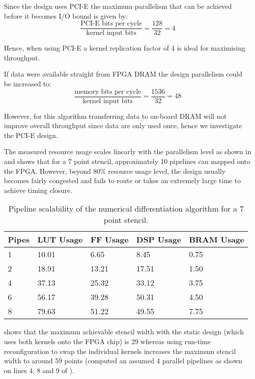 Since the design uses PCI-E the maximum parallelism that can be
achieved before it becomes I/O bound is given by:
$$\frac{\text{PCI-E bits per cycle}}{\text{kernel input bits}} = \frac{128}{32} = 4$$

Hence, when using PCI-E a kernel replication factor of 4 is ideal for
maximising throughput.

If data were available straight from FPGA DRAM the design parallelism
could be increased to:
$$\frac{\text{memory bits per cycle}}{\text{kernel input bits}} = \frac{1536}{32} = 48$$

However, for this algorithm transferring data to on-board DRAM will
not improve overall throughput since data are only used once, hence we
investigate the PCI-E design.

The measured resource usage scales linearly with the parallelism level
as shown in  and shows that for a 7 point stencil,
approximately 10 pipelines can mapped onto the FPGA. However, beyond
80\% resource usage level, the design usually becomes fairly congested
and fails to route or takes an extremely large time to achieve timing
closure.

\begin{table}[ht!]
  \begin{tabularx}{\textwidth}{X|X|X|X|X}
    Pipes & LUT Usage & FF Usage & DSP Usage & BRAM Usage \\
    \hline\hline
    1     & 10.01     & 6.65     & 8.45      & 0.75       \\
    2     & 18.91     & 13.21    & 17.51     & 1.50       \\
    4     & 37.13     & 25.32    & 33.12     & 3.75       \\
    6     & 56.17     & 39.28    & 50.31     & 4.50       \\
    8     & 79.63     & 51.22    & 49.55     & 7.75       \\
  \end{tabularx}
  \caption{Pipeline scalability of the numerical differentiation algorithm for a 7 point stencil.}
  \label{table:nd1}
\end{table}

 shows that the maximum achievable stencil width with
the static design (which uses both kernels onto the FPGA chip) is 29
whereas using run-time reconfiguration to swap the individual kernels
increases the maximum stencil width to around 59 points (computed an
assumed 4 parallel pipelines as shown on lines 4, 8 and 9 of
).

